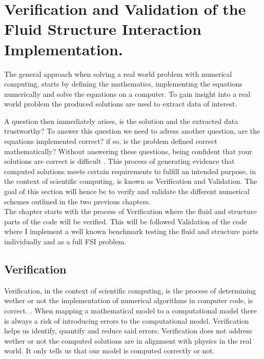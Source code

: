\chapter{Verification and Validation of the Fluid Structure Interaction Implementation.}\label{chap:VV}
The general approach when solving a real world problem with numerical computing, starts by defining the mathematics, implementing the equations numerically and solve the equations on a computer. To gain insight into a real world problem the produced solutions are used to extract data of interest.

A question then immediately arises, is the solution and the extracted data trustworthy?
To answer this question we need to adress another question, are the equations implemented correct? if so, is the problem defined correct mathematically?
Without answering these questions, being confident that your solutions are correct is difficult \cite{Selin2014}. This process of generating evidence that computed solutions meets certain requirements to fulfill an intended purpose, in the context of scientific computing, is known as Verification and Validation. The goal of this section will hence be to verify and validate the different numerical schemes outlined in the two previous chapters.  \\

The chapter starts with the process of Verification where the fluid and structure parts of the code will be verified. This will be followed Validation of the code where I implement a well known benchmark testing the fluid and structure parts individually and as a full FSI problem. \newline

\begin{comment}
We start with Verification, which is the process of assessing numerical correctness and accuracy of a computed solution. Then comes Validation, which is assessing physical accuracy of the numerical model, a process which is done by comparing numerical simulation with experimental data. In simple terms we check that we are solving the equations right and then that we are solving the right equations. The process of Verification has to always come before Validation. Because there is no need in checking if we are using the right equations if the equations are not solved right. 
\end{comment}

\section{Verification}
Verification, in the context of scientific computing, is the process of determining wether or not the implementation of numerical algorithms in computer code, is correct. \cite{Oberkampf2010}. 
When mapping a mathematical model to a computational model there is always a risk of introducing errors to the computational model. Verification helps us identify, quantify and reduce said errors. Verification does not address wether or not the computed solutions are in alignment with physics in the real world. It only tells us that our model is computed correctly or not. \newline

